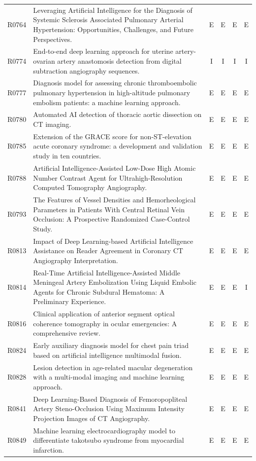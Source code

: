 \begin{longtable}{@{}l p{8.6cm} c c c c@{}}
R0764 & Leveraging Artificial Intelligence for the Diagnosis of Systemic Sclerosis Associated Pulmonary Arterial Hypertension: Opportunities, Challenges, and Future Perspectives. & E & E & E & E \\
R0774 & End-to-end deep learning approach for uterine artery-ovarian artery anastomosis detection from digital subtraction angiography sequences. & I & I & I & I \\
R0777 & Diagnosis model for assessing chronic thromboembolic pulmonary hypertension in high-altitude pulmonary embolism patients: a machine learning approach. & E & E & E & E \\
R0780 & Automated AI detection of thoracic aortic dissection on CT imaging. & E & E & E & E \\
R0785 & Extension of the GRACE score for non-ST-elevation acute coronary syndrome: a development and validation study in ten countries. & E & E & E & E \\
R0788 & Artificial Intelligence-Assisted Low-Dose High Atomic Number Contrast Agent for Ultrahigh-Resolution Computed Tomography Angiography. & E & E & E & E \\
R0793 & The Features of Vessel Densities and Hemorheological Parameters in Patients With Central Retinal Vein Occlusion: A Prospective Randomized Case-Control Study. & E & E & E & E \\
R0813 & Impact of Deep Learning-based Artificial Intelligence Assistance on Reader Agreement in Coronary CT Angiography Interpretation. & E & E & E & E \\
R0814 & Real-Time Artificial Intelligence-Assisted Middle Meningeal Artery Embolization Using Liquid Embolic Agents for Chronic Subdural Hematoma: A Preliminary Experience. & E & E & E & I \\
R0816 & Clinical application of anterior segment optical coherence tomography in ocular emergencies: A comprehensive review. & E & E & E & E \\
R0824 & Early auxiliary diagnosis model for chest pain triad based on artificial intelligence multimodal fusion. & E & E & E & E \\
R0828 & Lesion detection in age-related macular degeneration with a multi-modal imaging and machine learning approach. & E & E & E & E \\
R0841 & Deep Learning-Based Diagnosis of Femoropopliteal Artery Steno-Occlusion Using Maximum Intensity Projection Images of CT Angiography. & E & E & E & E \\
R0849 & Machine learning electrocardiography model to differentiate takotsubo syndrome from myocardial infarction. & E & E & E & E \\

\end{longtable}
